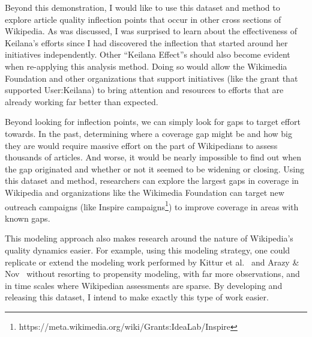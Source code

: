 Beyond this demonstration, I would like to use this dataset and method to explore article quality inflection points that occur in other cross sections of Wikipedia.  As was discussed, I was surprised to learn about the effectiveness of Keilana's efforts since I had discovered the inflection that started around her initiatives independently.  Other ``Keilana Effect''s should also become evident when re-applying this analysis method.  Doing so would allow the Wikimedia Foundation and other organizations that support initiatives (like the grant that supported User:Keilana) to bring attention and resources to efforts that are already working far better than expected.

Beyond looking for inflection points, we can simply look for gaps to target effort towards.  In the past, determining where a coverage gap might be and how big they are would require massive effort on the part of Wikipedians to assess thousands of articles.  And worse, it would be nearly impossible to find out when the gap originated and whether or not it seemed to be widening or closing.  Using this dataset and method, researchers can explore the largest gaps in coverage in Wikipedia and organizations like the Wikimedia Foundation can target new outreach campaigns (like Inspire campaigns\footnote{https://meta.wikimedia.org/wiki/Grants:IdeaLab/Inspire}) to improve coverage in areas with known gaps.

This modeling approach also makes research around the nature of Wikipedia's quality dynamics easier.  For example, using this modeling strategy, one could replicate or extend the modeling work performed by Kittur et al.~\cite{kittur08harnessing} and Arazy \& Nov~\cite{arazy10determinants} without resorting to propensity modeling, with far more observations, and in time scales where Wikipedian assessments are sparse.  By developing and releasing this dataset, I intend to make exactly this type of work easier.
